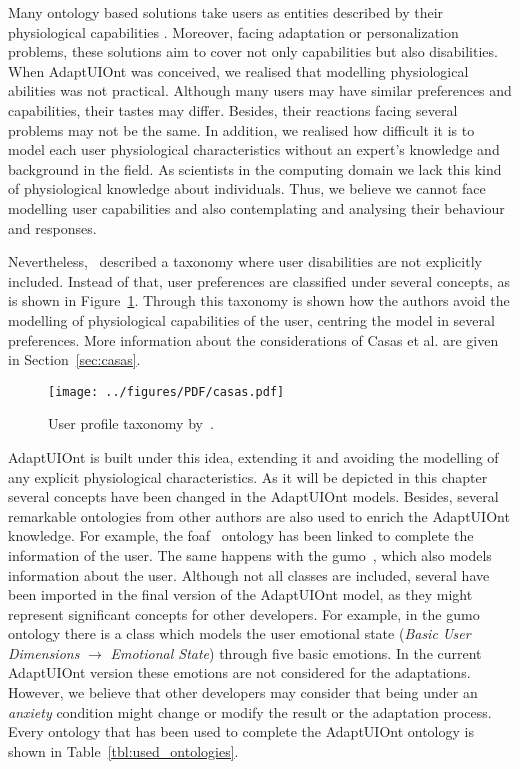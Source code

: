 Many ontology based solutions take users as entities described by their physiological
capabilities
\citep{gregor_designing_2002}\citep{razmerita_ontology_based_2003}\citep{pereira_triple_2005}\citep{persad_characterising_2007}\citep{persad_cognitive_2007}\citep{skillen2012ontological}. Moreover, facing adaptation or personalization problems, these solutions 
aim to cover not only capabilities but also disabilities. When AdaptUIOnt was 
conceived, we realised that modelling physiological abilities was not practical. 
Although many users may have similar preferences and capabilities, their tastes 
may differ. Besides, their reactions facing several problems may not be the same. 
In addition, we realised how difficult it is to model each user physiological 
characteristics without an expert's knowledge and background in the field. As 
scientists in the computing domain we lack this kind of physiological knowledge 
about individuals. Thus, we believe we cannot face modelling user capabilities 
and also contemplating and analysing their behaviour and responses.

Nevertheless,~\citet{casas_user_2008} described a taxonomy where user disabilities
are not explicitly included. Instead of that, user preferences are classified
under several concepts, as is shown in Figure~\ref{fig:casas}. Through this 
taxonomy is shown how the authors avoid the modelling of physiological capabilities 
of the user, centring the model in several preferences. More information about 
the considerations of Casas et al. are given in Section~\ref{sec:casas}.


\begin{figure}
\centering
\texttt{[image: ../figures/PDF/casas.pdf]}
\caption{User profile taxonomy by~\citet{casas_user_2008}.}
\label{fig:casas}
\end{figure}

AdaptUIOnt is built under this idea, extending it and avoiding the modelling of
any explicit physiological characteristics. As it will be depicted in this chapter
several concepts have been changed in the AdaptUIOnt models. Besides, several 
remarkable ontologies from other authors are also used to enrich the AdaptUIOnt 
knowledge. For example, the \ac{foaf}~\citep{foaf} ontology 
has been linked to complete the information of the user. The same happens with 
the \ac{gumo}~\citep{heckmann_gumogeneral_2005}, which also models information 
about the user. Although not all classes are included, several have been imported 
in the final version of the AdaptUIOnt model, as they might represent significant
concepts for other developers. For example, in the \ac{gumo} ontology there is a
class which models the user emotional state (\textit{Basic User Dimensions} $\rightarrow$ 
\textit{Emotional State}) through five basic emotions. In  the current AdaptUIOnt 
version these emotions are not considered for the adaptations. However, we believe
that other developers may consider that being under an \textit{anxiety} condition
might change or modify the result or the adaptation process. Every ontology that
has been used to complete the AdaptUIOnt ontology is shown in Table~\ref{tbl:used_ontologies}.

